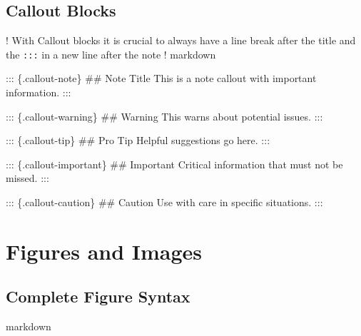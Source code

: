 \documentclass[
  11pt,
  letterpaper,
]{book}
\newenvironment{Shaded}{\begin{snugshade}}{\end{snugshade}}
\newcommand{\FunctionTok}[1]{\textcolor[rgb]{0.28,0.35,0.67}{#1}}
\newcommand{\NormalTok}[1]{\textcolor[rgb]{0.00,0.23,0.31}{#1}}
\begin{document}
\subsection*{Callout Blocks}\label{callout-blocks}

! With Callout blocks it is crucial to always have a line break after
the title and the \texttt{:::} in a new line after the note ! markdown

\begin{Shaded}
\begin{Highlighting}[]
\NormalTok{::: \{.callout{-}note\}}
\FunctionTok{\#\# Note Title}
\NormalTok{This is a note callout with important information.}
\NormalTok{:::}

\NormalTok{::: \{.callout{-}warning\}}
\FunctionTok{\#\# Warning}
\NormalTok{This warns about potential issues.}
\NormalTok{:::}

\NormalTok{::: \{.callout{-}tip\}}
\FunctionTok{\#\# Pro Tip}
\NormalTok{Helpful suggestions go here.}
\NormalTok{:::}

\NormalTok{::: \{.callout{-}important\}}
\FunctionTok{\#\# Important}
\NormalTok{Critical information that must not be missed.}
\NormalTok{:::}

\NormalTok{::: \{.callout{-}caution\}}
\FunctionTok{\#\# Caution}
\NormalTok{Use with care in specific situations.}
\NormalTok{:::}
\end{Highlighting}
\end{Shaded}

\section*{Figures and Images}\label{figures-and-images}


\subsection*{Complete Figure Syntax}\label{complete-figure-syntax}

markdown
\end{document}
